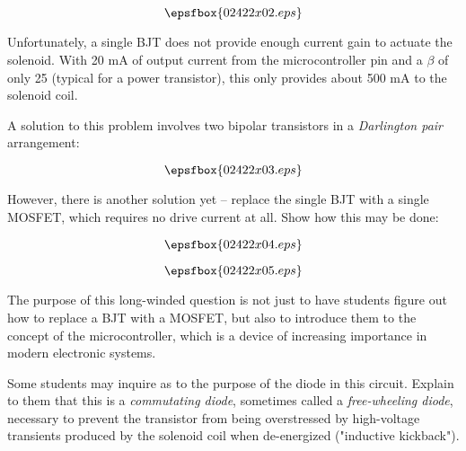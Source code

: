 $$\epsfbox{02422x02.eps}$$

Unfortunately, a single BJT does not provide enough current gain to actuate the solenoid.  With 20 mA of output current from the microcontroller pin and a $\beta$ of only 25 (typical for a power transistor), this only provides about 500 mA to the solenoid coil.

A solution to this problem involves two bipolar transistors in a {\it Darlington pair} arrangement:

$$\epsfbox{02422x03.eps}$$

However, there is another solution yet -- replace the single BJT with a single MOSFET, which requires no drive current at all.  Show how this may be done:

$$\epsfbox{02422x04.eps}$$







$$\epsfbox{02422x05.eps}$$







The purpose of this long-winded question is not just to have students figure out how to replace a BJT with a MOSFET, but also to introduce them to the concept of the microcontroller, which is a device of increasing importance in modern electronic systems.

Some students may inquire as to the purpose of the diode in this circuit.  Explain to them that this is a {\it commutating diode}, sometimes called a {\it free-wheeling diode}, necessary to prevent the transistor from being overstressed by high-voltage transients produced by the solenoid coil when de-energized ("inductive kickback").




